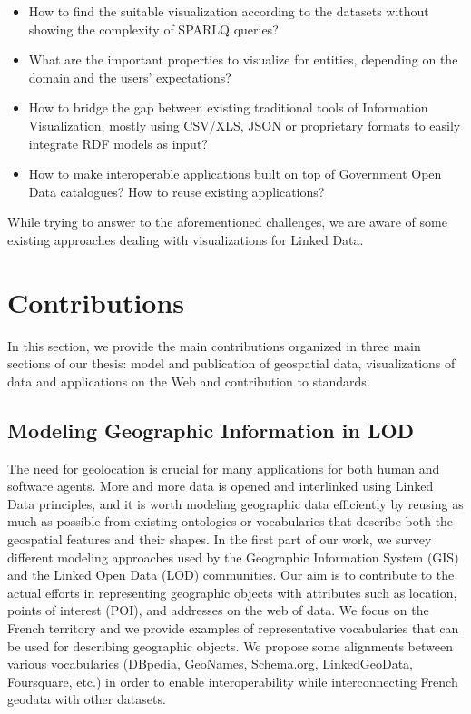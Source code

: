 \begin{itemize}
\item  How to find the suitable visualization according to the datasets without showing the complexity of SPARLQ queries?
 \item  What are the important properties to visualize for entities, depending on the domain and the users' expectations?
 \item  How to bridge the gap between existing traditional tools of Information Visualization, mostly using CSV/XLS, JSON or proprietary formats to easily integrate RDF models as input?
 \item How to make interoperable applications built on top of Government Open Data catalogues? How to reuse existing applications?
\end{itemize}
 
 While trying to answer to the aforementioned challenges, we are aware of some existing approaches dealing with visualizations for Linked Data. 


\section{Contributions}
\label{sec:contributions}
In this section, we provide the main contributions organized in three main sections of our thesis: model and publication of geospatial data, visualizations of data and applications on the Web and contribution to standards. 

\subsection{Modeling Geographic Information in LOD}
The need for geolocation is crucial for many applications for both human and software agents. More and more data is opened and interlinked using Linked Data principles, and it is worth modeling geographic data efficiently by reusing as much as possible from existing ontologies or vocabularies that describe both the geospatial features and their shapes. In the first part of our work, we survey different modeling approaches used by the Geographic Information System (GIS) and the Linked Open Data (LOD) communities. Our aim is to contribute to the actual efforts in representing geographic objects with attributes such as location, points of interest (POI), and addresses on the web of data. We focus on the French territory and we provide examples of representative vocabularies that can be used for describing geographic objects. We propose some alignments between various vocabularies (DBpedia, GeoNames, Schema.org, LinkedGeoData, Foursquare, etc.) in order to enable interoperability while interconnecting French geodata with other datasets. 

